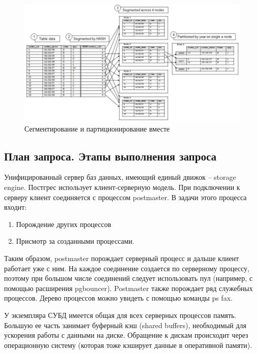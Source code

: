 \begin{figure}[ht!]
	\centering
	\includegraphics[width=18cm, keepaspectratio]{assets/segm.png}
	\caption{Сегментирование и партиционирование вместе} 
\end{figure}
\FloatBarrier

\newpage

\subsection{План запроса. Этапы выполнения запроса}

Унифицированный сервер баз данных, имеющий единый движок – storage
engine. Постгрес использует клиент-серверную модель.
При подключении к серверу клиент соединяется с процессом postmaster. В
задачи этого
процесса входит:

\begin{enumerate}
	\item Порождение других процессов
	\item Присмотр за созданными процессами.
\end{enumerate}

Таким образом, postmaster порождает серверный процесс и дальше клиент
работает уже с ним. На каждое соединение создается по серверному
процессу, поэтому при большом числе соединений следует использовать
пул (например, с помощью расширения pgbouncer). Postmaster также
порождает ряд служебных процессов. Дерево процессов можно увидеть с
помощью команды ps fax.

У экземпляра СУБД имеется общая для всех серверных процессов память.
Большую ее часть занимает буферный кэш (shared buffers), необходимый
для ускорения работы с данными на диске. Обращение к дискам
происходит через операционную систему (которая тоже кэширует данные в
оперативной памяти).

